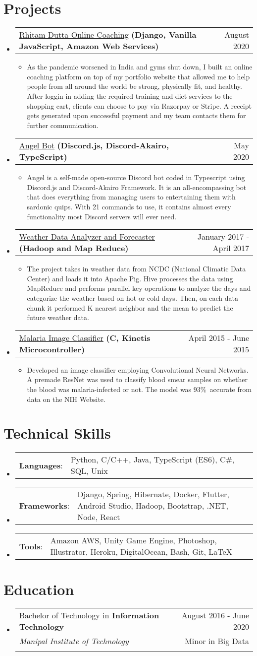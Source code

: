 \documentclass[letterpaper,11pt]{article}
\makeatletter
\newcommand{\sectionStart}{
  \begin{itemize}[label={},leftmargin=0in]
}
\newcommand{\sectionEnd}{
  \end{itemize}
}
\newcommand{\educationItem}[5]{
  \vspace{-1pt}
  \item
  \begin{tabular*}{\textwidth}{l@{\extracolsep{\fill}}r@{}}
    {#1 in \textbf{#2}}  & {#3}\\
    {\textit{#4}} & {#5}\\\vspace{-18pt}
  \end{tabular*}
  \vspace{-5pt}
}
\newcommand{\skillItem}[2]{
  \vspace{-1pt}
  \item
  \begin{tabular*}{1.0\textwidth}{l@{}l@{}}
    {\textbf{#1}: } & {#2}
  \end{tabular*}\vspace{-17pt}
}
\newcommand{\projectHeading}[4]{
  \vspace{-1pt}
  \item
  \begin{tabular*}{1.0\textwidth}{l@{\extracolsep{\fill}}r@{}}
    \normalsize{{\href{#1}{#2}} \textbf{#3}} & #4 \\
  \end{tabular*}\vspace{-5pt}
}
\newcommand{\listStart}{\begin{itemize}}
\newcommand{\listEnd}{\end{itemize}\vspace{-5pt}}
\newcommand{\bulletItem}[1]{
  \item
  \small{
    {#1 \vspace{-1.8pt}}
  }
}
\makeatother
\begin{document}
\section{Projects}
\sectionStart
  \projectHeading
    {https://rhitamdutta.com/coaching/}
    {Rhitam Dutta Online Coaching}
    {(Django, Vanilla JavaScript, Amazon Web Services)}
    {August 2020}
  \listStart
    \bulletItem
      {As the pandemic worsened in India and gyms shut down, I built an online coaching platform on top of my portfolio website that allowed me to help people from all around the world be strong, physically fit, and healthy. After loggin in adding the required training and diet services to the shopping cart, clients can choose to pay via Razorpay or Stripe. A receipt gets generated upon successful payment and my team contacts them for further communication.}
  \listEnd
  \projectHeading
    {https://github.com/exthazor/angel}
    {Angel Bot}
    {(Discord.js, Discord-Akairo, TypeScript)}
    {May 2020}
  \listStart
    \bulletItem
    {Angel is a self-made open-source Discord bot coded in Typescript using Discord.js and Discord-Akairo Framework. It is an all-encompassing bot that does everything from managing users to entertaining them with sardonic quips. With 21 commands to use, it contains almost every functionality most Discord servers will ever need.}
  \listEnd
  \projectHeading
    {}
    {Weather Data Analyzer and Forecaster}
    {(Hadoop and Map Reduce)}
    {January 2017 - April 2017}
  \listStart
    \bulletItem
      {The project takes in weather data from NCDC (National Climatic Data Center) and loads it into Apache Pig. Hive processes the data using MapReduce and performs parallel key operations to analyze the days and categorize the weather based on hot or cold days. Then, on each data chunk it performed K nearest neighbor and the mean to predict the future weather data.}
  \listEnd
  \projectHeading
    {https://github.com/dickwyn/onelap}
    {Malaria Image Classifier}
    {(C, Kinetis Microcontroller)}
    {April 2015 - June 2015}
  \listStart
    \bulletItem
      {Developed an image classifier employing Convolutional Neural Networks. A premade ResNet was used to classify blood smear samples on whether the blood was malaria-infected or not. The model was 93\%\ accurate from data on the NIH Website.}
  \listEnd
\sectionEnd

\section{Technical Skills}
\sectionStart
  \skillItem
    {Languages}
    {Python, C/C++, Java, TypeScript (ES6), C\#, SQL, Unix}
  \skillItem
    {Frameworks}
    {Django, Spring, Hibernate, Docker, Flutter, Android Studio, Hadoop, Bootstrap, .NET, Node, React}
  \skillItem
    {Tools}
    {Amazon AWS, Unity Game Engine, Photoshop, Illustrator, Heroku, DigitalOcean, Bash, Git, \LaTeX\ }
  \vspace{3pt}
\sectionEnd

\section{Education}
\sectionStart
  \educationItem
    {Bachelor of Technology} 
    {Information Technology} 
    {August 2016 - June 2020}
    {Manipal Institute of Technology} 
    {Minor in Big Data}
\sectionEnd
\end{document}
